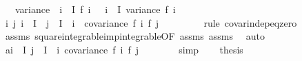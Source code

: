 \begin{isabellebody}
\ \ \ {\isachardoublequoteopen}variance\ {\isacharparenleft}{\kern0pt}{\isasymlambda}{\isasymomega}{\isachardot}{\kern0pt}\ {\isacharparenleft}{\kern0pt}{\isasymSum}i\ {\isasymin}\ I{\isachardot}{\kern0pt}\ f\ i\ {\isasymomega}{\isacharparenright}{\kern0pt}{\isacharparenright}{\kern0pt}\ {\isacharequal}{\kern0pt}\ {\isacharparenleft}{\kern0pt}{\isasymSum}i\ {\isasymin}\ I{\isachardot}{\kern0pt}\ variance\ {\isacharparenleft}{\kern0pt}f\ i{\isacharparenright}{\kern0pt}{\isacharparenright}{\kern0pt}{\isachardoublequoteclose}\isanewline
%
\isadelimproof
%
\endisadelimproof
%
\isatagproof
{}\isamarkupfalse%
\ {\isacharminus}{\kern0pt}\isanewline
\ \ \isamarkupfalse%
\ {\isachardoublequoteopen}{\isasymAnd}i\ j{\isachardot}{\kern0pt}\ i\ {\isasymin}\ I\ {\isasymLongrightarrow}\ j\ {\isasymin}\ I\ {\isacharminus}{\kern0pt}\ {\isacharbraceleft}{\kern0pt}i{\isacharbraceright}{\kern0pt}\ {\isasymLongrightarrow}\ covariance\ {\isacharparenleft}{\kern0pt}f\ i{\isacharparenright}{\kern0pt}\ {\isacharparenleft}{\kern0pt}f\ j{\isacharparenright}{\kern0pt}\ {\isacharequal}{\kern0pt}\ {}{\isachardoublequoteclose}\ \isanewline
\ \ \ \ \isamarkupfalse%
\ {\isacharparenleft}{\kern0pt}rule\ covar{\isacharunderscore}{\kern0pt}indep{\isacharunderscore}{\kern0pt}eq{\isacharunderscore}{\kern0pt}zero{\isacharparenright}{\kern0pt}\isanewline
\ \ \ \ \isamarkupfalse%
\ assms\ square{\isacharunderscore}{\kern0pt}integrable{\isacharunderscore}{\kern0pt}imp{\isacharunderscore}{\kern0pt}integrable{\isacharbrackleft}{\kern0pt}OF\ assms{\isacharparenleft}{\kern0pt}{}{\isacharparenright}{\kern0pt}\ assms{\isacharparenleft}{\kern0pt}{}{\isacharparenright}{\kern0pt}{\isacharbrackright}{\kern0pt}\ \isamarkupfalse%
\ auto\isanewline
\isanewline
\ \ \isamarkupfalse%
\ a{\isacharcolon}{\kern0pt}{\isachardoublequoteopen}{\isacharparenleft}{\kern0pt}{\isasymSum}i\ {\isasymin}\ I{\isachardot}{\kern0pt}\ {\isasymSum}j\ {\isasymin}\ I\ {\isacharminus}{\kern0pt}\ {\isacharbraceleft}{\kern0pt}i{\isacharbraceright}{\kern0pt}{\isachardot}{\kern0pt}\ covariance\ {\isacharparenleft}{\kern0pt}f\ i{\isacharparenright}{\kern0pt}\ {\isacharparenleft}{\kern0pt}f\ j{\isacharparenright}{\kern0pt}{\isacharparenright}{\kern0pt}\ {\isacharequal}{\kern0pt}\ {}{\isachardoublequoteclose}\isanewline
\ \ \ \ \isamarkupfalse%
\ simp\isanewline
\isanewline
\ \ \isamarkupfalse%
\ {\isacharquery}{\kern0pt}thesis\isanewline
\ \ \ \ \isamarkupfalse%

\end{isabellebody}
